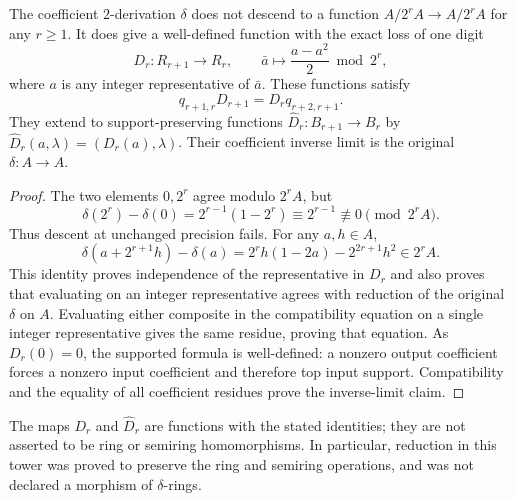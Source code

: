 \begin{proposition}\label{BLR-prop:delta-finite-precision}
The coefficient $2$-derivation $\delta$ does not descend to a function
$A/2^rA\to A/2^rA$ for any $r\geq1$. It does give a well-defined
function with the exact loss of one digit
\[
 D_r:R_{r+1}\longrightarrow R_r,\qquad
 \bar a\longmapsto\frac{a-a^2}{2}\bmod2^r,
\]
where $a$ is any integer representative of $\bar a$.
These functions satisfy
\[
 q_{r+1,r}D_{r+1}=D_rq_{r+2,r+1}.
\]
They extend to support-preserving functions
$\widehat D_r:B_{r+1}\to B_r$ by
$\widehat D_r(a,\lambda)=(D_r(a),\lambda)$.
Their coefficient inverse limit is the original $\delta:A\to A$.
\end{proposition}
\begin{proof}
The two elements $0,2^r$ agree modulo $2^rA$, but
\[
 \delta(2^r)-\delta(0)=2^{r-1}(1-2^r)
 \equiv2^{r-1}\not\equiv0\pmod{2^rA}.
\]
Thus descent at unchanged precision fails. For any $a,h\in A$,
\[
 \delta(a+2^{r+1}h)-\delta(a)
 =2^r h(1-2a)-2^{2r+1}h^2\in2^rA.
\]
This identity proves independence of the representative in $D_r$ and
also proves that evaluating on an integer representative agrees with
reduction of the original $\delta$ on $A$. Evaluating either composite
in the compatibility equation on a single integer representative gives
the same residue, proving that equation. As $D_r(0)=0$, the supported
formula is well-defined: a nonzero output coefficient forces a nonzero
input coefficient and therefore top input support. Compatibility and
the equality of all coefficient residues prove the inverse-limit claim.
\end{proof}

The maps $D_r$ and $\widehat D_r$ are functions with the stated
identities; they are not asserted to be ring or semiring homomorphisms.
In particular, reduction in this tower was proved to preserve the ring
and semiring operations, and was not declared a morphism of
$\delta$-rings.

